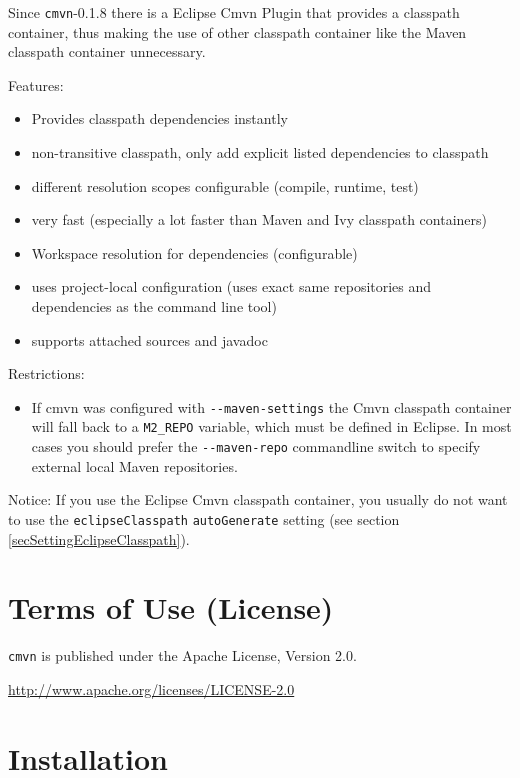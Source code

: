 \documentclass[a4paper,12pt,english,oneside,halfparskip]{scrartcl}
\newcommand{\CMVN}{\texttt{cmvn}}
\newcommand{\cmvn}{\texttt{cmvn}}
\newcommand{\code}[1]{\texttt{#1}}
\newcommand{\cmdoption}[1]{\code{-{}-#1}}
\begin{document}
Since \cmvn{}-0.1.8 there is a Eclipse Cmvn Plugin that provides a classpath container, thus making the use of other classpath container like the Maven classpath container unnecessary.

Features:
\begin{itemize}
 \item Provides classpath dependencies instantly
 \item non-transitive classpath, only add explicit listed dependencies to classpath
 \item different resolution scopes configurable (compile, runtime, test)
 \item very fast (especially a lot faster than Maven and Ivy classpath containers)
 \item Workspace resolution for dependencies (configurable)
 \item uses project-local configuration (uses exact same repositories and dependencies as the command line tool)
 \item supports attached sources and javadoc
\end{itemize}

Restrictions:
\begin{itemize}
 \item If cmvn was configured with \cmdoption{maven-settings} the Cmvn classpath container will fall back to a \code{M2\_REPO} variable, which must be defined in Eclipse. In most cases you should prefer the \cmdoption{maven-repo} commandline switch to specify external local Maven repositories.
\end{itemize}

Notice: If you use the Eclipse Cmvn classpath container, you usually do not want to use the \code{eclipseClasspath}  \code{autoGenerate} setting (see section \ref{secSettingEclipseClasspath}).

\section{Terms of Use (License)}

\CMVN{} is published under the Apache License, Version 2.0.

\url{http://www.apache.org/licenses/LICENSE-2.0}


\section{Installation}
\end{document}
